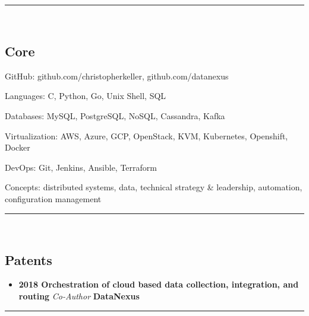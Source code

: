 

\hrule\
\vspace{-0.4em}
\subsection*{Core}
\begin{indentsection}{\parindent}
    \begin{description*}
        \item[GitHub:] github.com/christopherkeller, github.com/datanexus
        \item[Languages:] C, Python, Go, Unix Shell, \textsc{SQL}
        \item[Databases:] My\textsc{SQL}, Postgre\textsc{SQL}, NoSQL, Cassandra, Kafka
        \item[Virtualization:] AWS, Azure, GCP, OpenStack, KVM, Kubernetes, Openshift, Docker
        \item[DevOps:] Git, Jenkins, Ansible, Terraform
        \item[Concepts:] distributed systems, data, technical strategy \& leadership, automation, configuration management
	\end{description*}
\end{indentsection}
\hrule\
\vspace{-0.4em}

\subsection*{Patents}

\begin{itemize}
    \parskip=0.1em
    \item
    \headerrow
        {\textbf{2018 Orchestration of cloud based data collection, integration, and routing} {\emph{Co-Author}}}
        {\textbf{DataNexus}}
\end{itemize}

\hrule\
\vspace{-0.4em}

